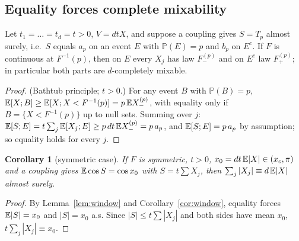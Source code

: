 \documentclass[11pt]{amsart}
\newtheorem{corollary}[theorem]{Corollary}\newtheorem{conjecture}[theorem]{Conjecture}
\theoremstyle{definition}\newtheorem{definition}[theorem]{Definition}\theoremstyle{remark}\newtheorem{remark}[theorem]{Remark}
\begin{document}
\subsection{Equality forces complete mixability}
\begin{proposition}\label{prop:eq-mix}
Let $t_1=\dots=t_d=t>0$, $V=dtX$, and suppose a coupling gives $S=T_p$ almost surely, i.e.\ $S$ equals $a_p$ on an event $E$ with $\mathbb P(E)=p$ and $b_p$ on
$E^c$. If $F$ is continuous at $F^{-1}(p)$, then on $E$ every $X_j$ has law $F_-^{(p)}$ and on $E^c$ law $F_+^{(p)}$; in particular both parts are $d$-completely
mixable.
\end{proposition}
\begin{proof}(Bathtub principle; $t>0$.) For any event $B$ with $\mathbb P(B)=p$, $\mathbb E[X;B]\ge\mathbb E[X;X<F^{-1}(p)]=p\,\mathbb E X_-^{(p)}$, with equality only if $B=\{X<F^{-1}(p)\}$ up to
null sets. Summing over $j$: $\mathbb E[S;E]=t\sum_j\mathbb E[X_j;E]\ge p\,dt\,\mathbb E X_-^{(p)}=p\,a_p$, and $\mathbb E[S;E]=p\,a_p$ by assumption; so equality holds for every $j$.\end{proof}
\begin{corollary}[symmetric case]\label{cor:eq-mix-sym}
If $F$ is symmetric, $t>0$, $x_0=dt\,\mathbb E|X|\in(x_c,\pi)$ and a coupling gives $\mathbb E\cos S=\cos x_0$ with $S=t\sum X_j$, then $\sum_j|X_j|\equiv d\,\mathbb E|X|$ almost surely.
\end{corollary}
\begin{proof}By Lemma~\ref{lem:window} and Corollary~\ref{cor:window}, equality forces $\mathbb E|S|=x_0$ and $|S|=x_0$ a.s. Since $|S|\le t\sum|X_j|$ and both sides
have mean $x_0$, $t\sum_j|X_j|\equiv x_0$.\end{proof}
\end{document}
